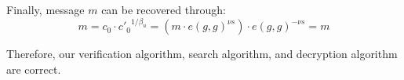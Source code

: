 \documentclass[runningheads]{llncs}
\begin{document}
Finally, message $m$ can be recovered through: 
$$m = c_0 \cdot {c'_0}^{1/\beta_u} = \left( m \cdot e(g,g)^{\nu s} \right) \cdot e(g,g)^{-\nu s} = m$$

Therefore, our verification algorithm, search algorithm, and decryption algorithm are correct.

%
%
%


\end{document}
